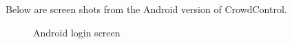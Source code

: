 Below are screen shots from the Android version of CrowdControl.


	\begin{figure}[tbh]
	\begin{center}
	\end{center}
	\caption{Android login screen \label{AndroudLoginScreen}}
	\end{figure}

